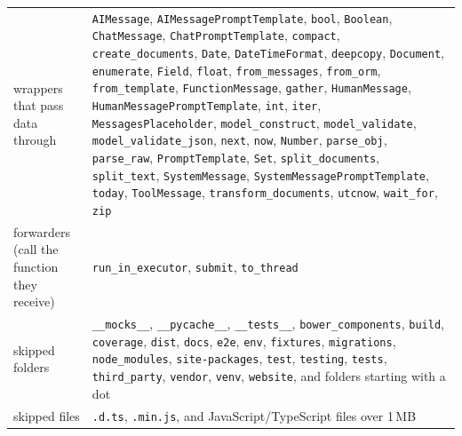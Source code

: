{\begin{longtable}{@{}>{\raggedright\arraybackslash}p{}>{\raggedright\arraybackslash}p{}@{}}
wrappers that pass data through & \texttt{AIMessage}, \texttt{AIMessagePromptTemplate}, \texttt{bool}, \texttt{Boolean}, \texttt{ChatMessage}, \texttt{ChatPromptTemplate}, \texttt{compact}, \texttt{create\_documents}, \texttt{Date}, \texttt{DateTimeFormat}, \texttt{deepcopy}, \texttt{Document}, \texttt{enumerate}, \texttt{Field}, \texttt{float}, \texttt{from\_messages}, \texttt{from\_orm}, \texttt{from\_template}, \texttt{FunctionMessage}, \texttt{gather}, \texttt{HumanMessage}, \texttt{HumanMessagePromptTemplate}, \texttt{int}, \texttt{iter}, \texttt{MessagesPlaceholder}, \texttt{model\_construct}, \texttt{model\_validate}, \texttt{model\_validate\_json}, \texttt{next}, \texttt{now}, \texttt{Number}, \texttt{parse\_obj}, \texttt{parse\_raw}, \texttt{PromptTemplate}, \texttt{Set}, \texttt{split\_documents}, \texttt{split\_text}, \texttt{SystemMessage}, \texttt{SystemMessagePromptTemplate}, \texttt{today}, \texttt{ToolMessage}, \texttt{transform\_documents}, \texttt{utcnow}, \texttt{wait\_for}, \texttt{zip} \\
forwarders (call the function they receive) & \texttt{run\_in\_executor}, \texttt{submit}, \texttt{to\_thread} \\
skipped folders & \texttt{\_\_mocks\_\_}, \texttt{\_\_pycache\_\_}, \texttt{\_\_tests\_\_}, \texttt{bower\_components}, \texttt{build}, \texttt{coverage}, \texttt{dist}, \texttt{docs}, \texttt{e2e}, \texttt{env}, \texttt{fixtures}, \texttt{migrations}, \texttt{node\_modules}, \texttt{site-packages}, \texttt{test}, \texttt{testing}, \texttt{tests}, \texttt{third\_party}, \texttt{vendor}, \texttt{venv}, \texttt{website}, and folders starting with a dot \\
skipped files & \texttt{.d.ts}, \texttt{.min.js}, and JavaScript/TypeScript files over 1\,MB \\
\end{longtable}

}